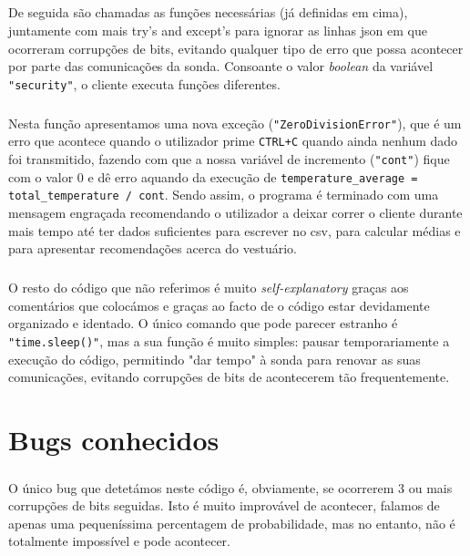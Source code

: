 \documentclass[a4paper]{report}
\begin{document}
\paragraph{}De seguida são chamadas as funções necessárias (já definidas em cima), juntamente com mais try's and except's para ignorar as linhas \ac{json} em que ocorreram corrupções de bits, evitando qualquer tipo de erro que possa acontecer por parte das comunicações da sonda. Consoante o valor \textit{boolean} da variável \texttt{"security"}, o cliente executa funções diferentes.

\paragraph{}Nesta função apresentamos uma nova exceção (\texttt{"ZeroDivisionError"}), que é um erro que acontece quando o utilizador prime \texttt{CTRL+C} quando ainda nenhum dado foi transmitido, fazendo com que a nossa variável de incremento (\texttt{"cont"}) fique com o valor 0 e dê erro aquando da execução de \texttt{temperature\_average = total\_temperature / cont}. Sendo assim, o programa é terminado com uma mensagem engraçada recomendando o utilizador a deixar correr o cliente durante mais tempo até ter dados suficientes para escrever no \ac{csv}, para calcular médias e para apresentar recomendações acerca do vestuário.

\paragraph{}O resto do código que não referimos é muito \textit{self-explanatory} graças aos comentários que colocámos e graças ao facto de o código estar devidamente organizado e identado. O único comando que pode parecer estranho é \texttt{"time.sleep()"}, mas a sua função é muito simples: pausar temporariamente a execução do código, permitindo "dar tempo" à sonda para renovar as suas comunicações, evitando corrupções de bits de acontecerem tão frequentemente.\cite{delay}

\chapter{Bugs conhecidos}
\label{chap.bugs}
\paragraph{}O único bug que detetámos neste código é, obviamente, se ocorrerem 3 ou mais corrupções de bits seguidas. Isto é muito improvável de acontecer, falamos de apenas uma pequeníssima percentagem de probabilidade, mas no entanto, não é totalmente impossível e pode acontecer.
\end{document}
